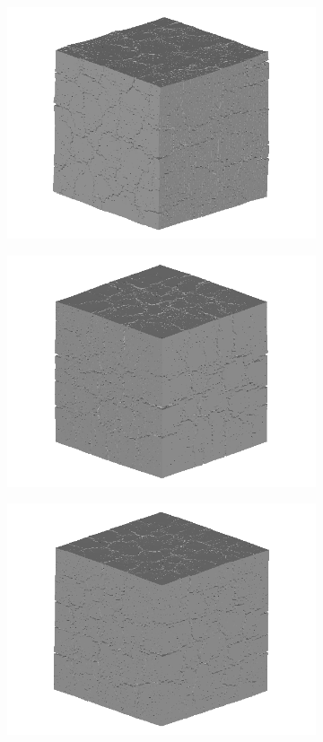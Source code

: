 \begin{figure}[ht]
\centering
    \begin{subfigure}{.33\textwidth}
      \centering
      \includegraphics[width=.8\linewidth]{Files/exp_3D/ASR/A30P75_3_3d.png}
    \end{subfigure}%
    \begin{subfigure}{.33\textwidth}
      \centering
      \includegraphics[width=.8\linewidth]{Files/exp_3D/DEF/A30X0C_3_3d.png}
    \end{subfigure}%
    \begin{subfigure}{.33\textwidth}
      \centering
      \includegraphics[width=.8\linewidth]{Files/exp_3D/DEF/A30X-5C_3_3d.png}

\end{subfigure}
\end{figure}
